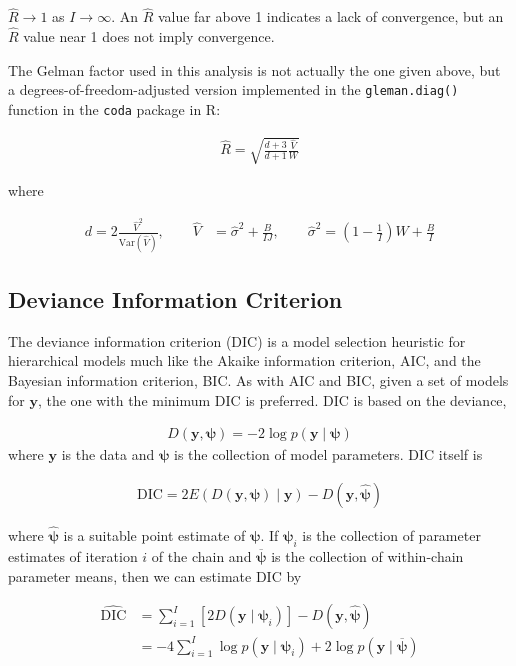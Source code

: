 \documentclass{article}\usepackage{graphicx, color}
\providecommand{\ov}[1]{\overline{#1}}
\providecommand{\q}{$\quad$ \newline}
\providecommand{\rt}{\rightarrow}
\providecommand{\vc}[1]{\boldsymbol{#1}}
\providecommand{\wh}[1]{\widehat{#1}}
\begin{document}
\begin{flushleft}
$\wh{R} \rt 1$ as $I \rt \infty$. An $\wh{R}$ value far above 1 indicates a lack of convergence, but an $\wh{R}$ value near 1 does not imply convergence. \q

The Gelman factor used in this analysis is not actually the one given above, but a degrees-of-freedom-adjusted version implemented in the {\tt gleman.diag()} function in the {\tt coda} package in R:

\begin{align*}
\wh{R} = \sqrt{\frac{d + 3}{d + 1} \frac{\wh{V}}{W}}
\end{align*}

where

\begin{align*}
d = 2 \frac{\wh{V}^2}{\text{Var}(\wh{V})}, \qquad \wh{V} &= \wh{\sigma}^2 + \frac{B}{IJ}, \qquad \wh{\sigma}^2 = \left (1 - \frac{1}{I} \right ) W + \frac{B}{I}
\end{align*}



\subsection{Deviance Information Criterion}

The deviance information criterion (DIC) is a model selection heuristic for hierarchical models much like the Akaike information criterion, AIC, and the Bayesian information criterion, BIC. As with AIC and BIC, given a set of models for $\vc{y}$, the one with the minimum DIC is preferred. DIC is based on the deviance, 

\begin{align*}
D(\vc{y}, \vc{\psi}) = -2 \log p(\vc{y} \mid \vc{\psi})
\end{align*}
where $\vc{y}$ is the data and $\vc{\psi}$ is the collection of model parameters. DIC itself is

\begin{align*}
\text{DIC} = 2 E(D(\vc{y}, \vc{\psi}) \mid \vc{y}) - D(\vc{y}, \wh{\vc{\psi}})
\end{align*}

where $\wh{\vc{\psi}}$ is a suitable point estimate of $\vc{\psi}$. If $\vc{\psi}_i$ is the collection of parameter estimates of iteration $i$ of the chain and $\ov{\vc{\psi}}$ is the collection of within-chain parameter means, then we can estimate DIC by

\begin{align*}
\wh{\text{DIC}} &=  \sum_{i = 1}^I [2 D(\vc{y} \mid \vc{\psi}_i)] - D(\vc{y}, \wh{\vc{\psi}}) \\
&= -4 \sum_{i = 1}^I \log p(\vc{y} \mid \vc{\psi}_i) + 2 \log p(\vc{y} \mid \ov{\vc{\psi}})
\end{align*}


\end{flushleft}
\end{document}
